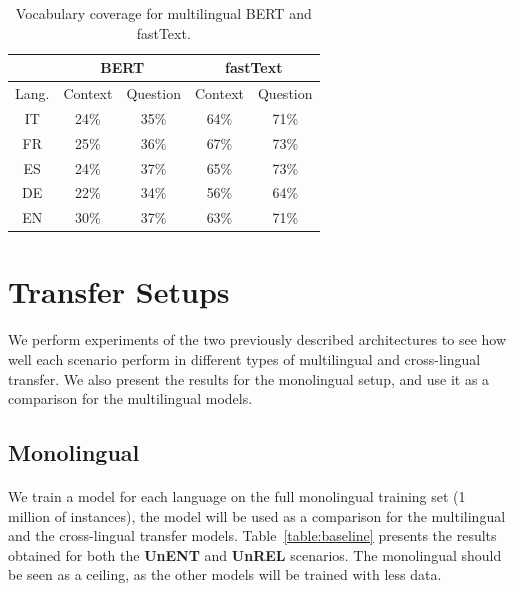 \begin{table}[h!]
  \centering
  \begin{adjustbox}{width=0.6\columnwidth}
    \begin{tabular}{c|cc|cc}
    \toprule
          & \multicolumn{2}{c|}{BERT} & \multicolumn{2}{c}{fastText} \\
    \midrule
    \multicolumn{1}{l|}{Lang.} & Context & Question & Context & Question \\
    \midrule
    IT    & 24\%  & 35\%  & 64\%  & 71\%  \\
    FR    & 25\%  & 36\%  & 67\%  & 73\%  \\
    ES    & 24\%  & 37\%  & 65\%  & 73\%  \\
    DE    & 22\%  & 34\%  & 56\%  & 64\%  \\
    EN    & 30\%  & 37\%  & 63\%  & 71\%  \\
    \bottomrule
    \end{tabular}%
  \end{adjustbox}
  \caption{Vocabulary coverage for multilingual BERT and fastText.}
  \label{tab:lang_model_coverage}%

\end{table}%

\newpage

\section{Transfer Setups}
\paragraph{}
We perform experiments of the two previously described architectures to see how well each scenario perform in different types of multilingual and cross-lingual transfer. We also present the results for the monolingual setup, and use it as a comparison for the multilingual models. 


\subsection{Monolingual}
\paragraph{}
We train a model for each language on the full monolingual training set (1 million of instances), the model will be used as a comparison for the multilingual and the cross-lingual transfer models. Table~\ref{table:baseline} presents the results obtained for both the \textbf{UnENT} and \textbf{UnREL} scenarios. The monolingual should be seen as a ceiling, as the other models will be trained with less data.

